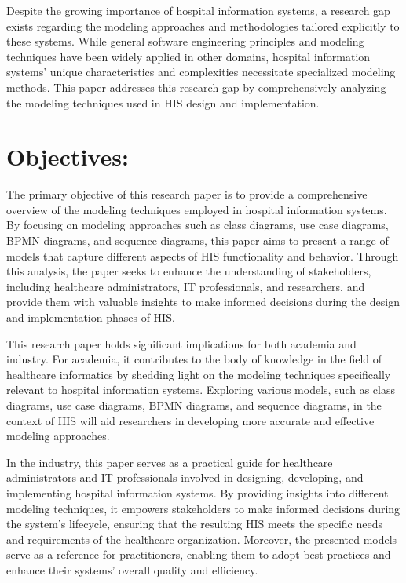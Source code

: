 Despite the growing importance of hospital information systems, a research gap exists regarding the modeling approaches and methodologies tailored explicitly to these systems. While general software engineering principles and modeling techniques have been widely applied in other domains, hospital information systems' unique characteristics and complexities necessitate specialized modeling methods. This paper addresses this research gap by comprehensively analyzing the modeling techniques used in HIS design and implementation.

\section{Objectives:}

The primary objective of this research paper is to provide a comprehensive overview of the modeling techniques employed in hospital information systems. By focusing on modeling approaches such as class diagrams, use case diagrams, BPMN diagrams, and sequence diagrams, this paper aims to present a range of models that capture different aspects of HIS functionality and behavior. Through this analysis, the paper seeks to enhance the understanding of stakeholders, including healthcare administrators, IT professionals, and researchers, and provide them with valuable insights to make informed decisions during the design and implementation phases of HIS.

This research paper holds significant implications for both academia and industry. For academia, it contributes to the body of knowledge in the field of healthcare informatics by shedding light on the modeling techniques specifically relevant to hospital information systems. Exploring various models, such as class diagrams, use case diagrams, BPMN diagrams, and sequence diagrams, in the context of HIS will aid researchers in developing more accurate and effective modeling approaches.

In the industry, this paper serves as a practical guide for healthcare administrators and IT professionals involved in designing, developing, and implementing hospital information systems. By providing insights into different modeling techniques, it empowers stakeholders to make informed decisions during the system's lifecycle, ensuring that the resulting HIS meets the specific needs and requirements of the healthcare organization. Moreover, the presented models serve as a reference for practitioners, enabling them to adopt best practices and enhance their systems' overall quality and efficiency.

